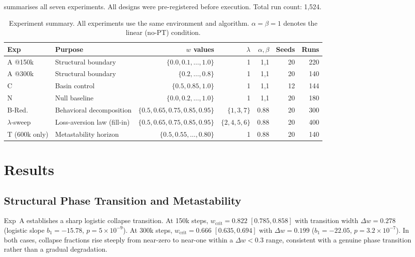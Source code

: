 \documentclass[11pt]{article}
\newcommand{\wcrit}{w_{\mathrm{crit}}}
\begin{document}
 summarises all seven experiments.
All designs were pre-registered before execution.
Total run count: 1,524.

\begin{table}[t]
\centering
\caption{Experiment summary. All experiments use the same environment and
algorithm.  $\alpha{=}\beta{=}1$ denotes the linear (no-PT) condition.}
\label{tab:experiments}
\small
\begin{tabular}{llrrrrr}
\toprule
Exp & Purpose & $w$ values & $\lambda$ & $\alpha,\beta$ & Seeds & Runs \\
\midrule
A @150k  & Structural boundary  & $\{0.0, 0.1,\ldots, 1.0\}$ & 1 & 1,1 & 20 & 220 \\
A @300k  & Structural boundary  & $\{0.2,\ldots, 0.8\}$       & 1 & 1,1 & 20 & 140 \\
C        & Basin control        & $\{0.5, 0.85, 1.0\}$        & 1 & 1,1 & 12 & 144 \\
N        & Null baseline        & $\{0.0, 0.2,\ldots, 1.0\}$  & 1 & 1,1 & 20 & 180 \\
B-Red.   & Behavioral decomposition & $\{0.5, 0.65, 0.75, 0.85, 0.95\}$ & $\{1,3,7\}$ & 0.88 & 20 & 300 \\
$\lambda$-sweep & Loss-aversion law (fill-in) & $\{0.5, 0.65, 0.75, 0.85, 0.95\}$ & $\{2,4,5,6\}$ & 0.88 & 20 & 400 \\
T (600k only) & Metastability horizon & $\{0.5, 0.55,\ldots, 0.80\}$ & 1 & 0.88 & 20 & 140 \\
\bottomrule
\end{tabular}
\end{table}

\section{Results}
\label{sec:results}

\subsection{Structural Phase Transition and Metastability}
\label{sec:results_structural}

Exp~A establishes a sharp logistic collapse transition.
At 150k steps, $\wcrit = 0.822$ $[0.785, 0.858]$ with transition width
$\Delta w = 0.278$ (logistic slope $b_1 = -15.78$, $p = 5 \times 10^{-9}$).
At 300k steps, $\wcrit = 0.666$ $[0.635, 0.694]$ with $\Delta w = 0.199$
($b_1 = -22.05$, $p = 3.2 \times 10^{-7}$).
In both cases, collapse fractions rise steeply from near-zero to near-one
within a $\Delta w < 0.3$ range, consistent with a genuine phase
transition rather than a gradual degradation.
\end{document}
